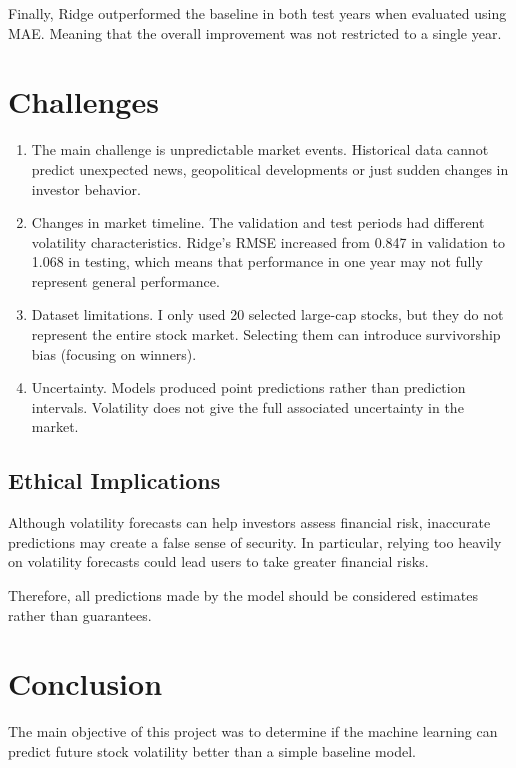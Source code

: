 \documentclass[11pt]{article}
\begin{document}
Finally, Ridge outperformed the baseline in both test years when evaluated using MAE. Meaning that the overall improvement was not restricted to a single year.

\section{Challenges}

\begin{enumerate}
\item The main challenge is unpredictable market events. Historical data cannot predict unexpected news, geopolitical developments or just sudden changes in investor behavior.
\item Changes in market timeline. The validation and test periods had different volatility characteristics. Ridge's RMSE increased from 0.847 in validation to 1.068 in testing, which means that performance in one year may not fully represent general performance.
\item Dataset limitations. I only used 20 selected large-cap stocks, but they do not represent the entire stock market. Selecting them can introduce survivorship bias (focusing on winners).
\item Uncertainty. Models produced point predictions rather than prediction intervals. Volatility does not give the full associated uncertainty in the market.
\end{enumerate}

\subsection*{Ethical Implications}

Although volatility forecasts can help investors assess financial risk, inaccurate predictions may create a false sense of security. In particular, relying too heavily on volatility forecasts could lead users to take greater financial risks.

Therefore, all predictions made by the model should be considered estimates rather than guarantees.

\section{Conclusion}

The main objective of this project was to determine if the machine learning can predict future stock volatility better than a simple baseline model.
\end{document}
